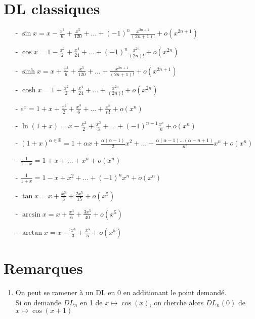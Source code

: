 \documentclass[fleqn]{article}
\theoremstyle{definition} \newtheorem*{defi}{D\'efinition}
\theoremstyle{definition} \newtheorem*{theo}{Th\'eor\`eme}
\theoremstyle{definition} \newtheorem*{prop}{Propri\'et\'e}
\theoremstyle{definition} \newtheorem*{coro}{Corollaire}
\theoremstyle{remark} \newtheorem*{rqs}{Remarques}
\begin{document}
\section{DL classiques}
\begin{itemize}
	\item [-] $\sin x = x - \frac{x^3}{6} + \frac{x^5}{120} + \hdots + (-1)^n \frac{x^{2n+1}}{(2n+1)!} + o(x^{2n+1})$
	\item [-] $\cos x = 1 - \frac{x^2}{2} + \frac{x^4}{24} + \hdots + (-1)^n \frac{x^{2n}}{(2n)!} + o(x^{2n})$
	\item [-] $\sinh x = x + \frac{x^3}{6} + \frac{x^5}{120} + \hdots + \frac{x^{2n+1}}{(2n+1)!} + o(x^{2n+1})$
	\item [-] $\cosh x = 1 + \frac{x^2}{2} + \frac{x^4}{24} + \hdots + \frac{x^{2n}}{(2n)!} + o(x^{2n})$
	\item [-] $e^x = 1 + x + \frac{x^2}{2} + \frac{x^3}{6} + \hdots + \frac{x^n}{n!} + o(x^n)$
	\item [-] $\ln(1+x) = x - \frac{x^2}{2} + \frac{x^3}{3} + \hdots + (-1)^{n-1} \frac{x^n}{n} + o(x^n)$
	\item [-] $(1+x)^{\alpha \in \mathbb{R}} = 1 + \alpha x + \frac{\alpha(\alpha -1)}{2} x^2 + \hdots + \frac{\alpha(\alpha-1)\hdots
		(\alpha-n+1)}{n!} x^n + o(x^n)$
	\item [-] $\frac{1}{1-x} = 1 + x + \hdots + x^n + o(x^n)$
	\item [-] $\frac{1}{1+x} = 1 - x + x^2 + \hdots + (-1)^n x^n + o(x^n)$
	\item [-] $\tan x = x + \frac{x^3}{3} + \frac{2x^5}{15} + o(x^5)$
	\item [-] $\arcsin x = x + \frac{x^3}{6} + \frac{3x^5}{40} + o(x^5)$
	\item [-] $\arctan x = x - \frac{x^3}{3} + \frac{x^5}{5} + o(x^5)$
\end{itemize}

\section{Remarques}
\begin{enumerate}
	\item On peut se ramener \`a un DL en $0$ en additionant le point demand\'e. \\
	Si on demande $DL_n$ en 1 de $x \mapsto \cos(x)$, on cherche alors $DL_n(0)$ de $x \mapsto \cos(x+1)$
\end{enumerate}
\end{document}
